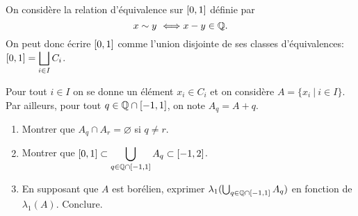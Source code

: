 %
\begin{td-exo}
    
    On considère la relation d'équivalence sur \(\mathopen{}\left[0,1\right]\mathclose{}\) définie par
    \[
    x\sim y\ \Longleftrightarrow x-y\in\mathbb{Q}.
    \]
    On peut donc écrire \(\mathopen{}\left[0,1\right]\mathclose{}\) comme l'union disjointe de ses classes d'équivalences: \(\displaystyle\mathopen{}\left[0,1\right]\mathclose{} = \bigsqcup_{i\in I}C_i\).
    
    Pour tout \(i\in I\) on se donne un élément \(x_i\in C_i\) et on considère \(A=\{x_i\ |\ i\in I\}\). Par ailleurs, pour tout \(q\in\mathbb{Q}\cap\mathopen{}\left[-1,1\right]\mathclose{}\), on note \(A_q=A+q\).
    \begin{enumerate}
        \item Montrer que \(A_q\cap A_r = \varnothing\) si \(q\neq r\).
        
        \item Montrer que \(\displaystyle \mathopen{}\left[0,1\right]\mathclose{} \subset \bigcup_{q\in\mathbb{Q}\cap\mathopen{}\left[-1,1\right]\mathclose{}}A_q \subset \mathopen{}\left[-1,2\right]\mathclose{}\).
        
        \item En supposant que \(A\) est borélien, exprimer \(\lambda_1(\bigcup_{q\in\mathbb{Q}\cap\mathopen{}\left[-1,1\right]\mathclose{}}A_q)\) en fonction de \(\lambda_1(A)\). Conclure.
    \end{enumerate}
\end{td-exo}
